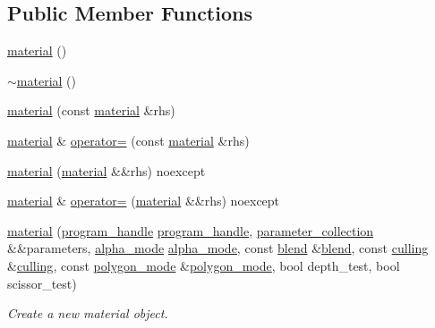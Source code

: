 \subsection*{Public Member Functions}
\begin{DoxyCompactItemize}
\item 
\mbox{\hyperlink{classmoka_1_1material_a851d0531a3bd13fe9594bad9c460eb73}{material}} ()
\item 
\mbox{\hyperlink{classmoka_1_1material_a50747c3e67abffb9c85d1ea2490e42b5}{$\sim$material}} ()
\item 
\mbox{\hyperlink{classmoka_1_1material_a68636cba205cc90086863630778dd56c}{material}} (const \mbox{\hyperlink{classmoka_1_1material}{material}} \&rhs)
\item 
\mbox{\hyperlink{classmoka_1_1material}{material}} \& \mbox{\hyperlink{classmoka_1_1material_a90042ca024f8fe181e8b6313203f211c}{operator=}} (const \mbox{\hyperlink{classmoka_1_1material}{material}} \&rhs)
\item 
\mbox{\hyperlink{classmoka_1_1material_a2d226f9f3b7736207af1f7035674b8ef}{material}} (\mbox{\hyperlink{classmoka_1_1material}{material}} \&\&rhs) noexcept
\item 
\mbox{\hyperlink{classmoka_1_1material}{material}} \& \mbox{\hyperlink{classmoka_1_1material_a00ec8ed5fb0754ed02f53c8f98e9e366}{operator=}} (\mbox{\hyperlink{classmoka_1_1material}{material}} \&\&rhs) noexcept
\item 
\mbox{\hyperlink{classmoka_1_1material_a01b3dc796afae0e2446c99abeee6aba7}{material}} (\mbox{\hyperlink{structmoka_1_1program__handle}{program\+\_\+handle}} \mbox{\hyperlink{structmoka_1_1program__handle}{program\+\_\+handle}}, \mbox{\hyperlink{classmoka_1_1parameter__collection}{parameter\+\_\+collection}} \&\&parameters, \mbox{\hyperlink{namespacemoka_ad3e7f1428e786c2e7780186b8c0b0d81}{alpha\+\_\+mode}} \mbox{\hyperlink{namespacemoka_ad3e7f1428e786c2e7780186b8c0b0d81}{alpha\+\_\+mode}}, const \mbox{\hyperlink{structmoka_1_1blend}{blend}} \&\mbox{\hyperlink{structmoka_1_1blend}{blend}}, const \mbox{\hyperlink{structmoka_1_1culling}{culling}} \&\mbox{\hyperlink{structmoka_1_1culling}{culling}}, const \mbox{\hyperlink{structmoka_1_1polygon__mode}{polygon\+\_\+mode}} \&\mbox{\hyperlink{structmoka_1_1polygon__mode}{polygon\+\_\+mode}}, bool depth\+\_\+test, bool scissor\+\_\+test)
\begin{DoxyCompactList}\small\item\em Create a new material object. \end{DoxyCompactList}\item 

\end{DoxyCompactItemize}
